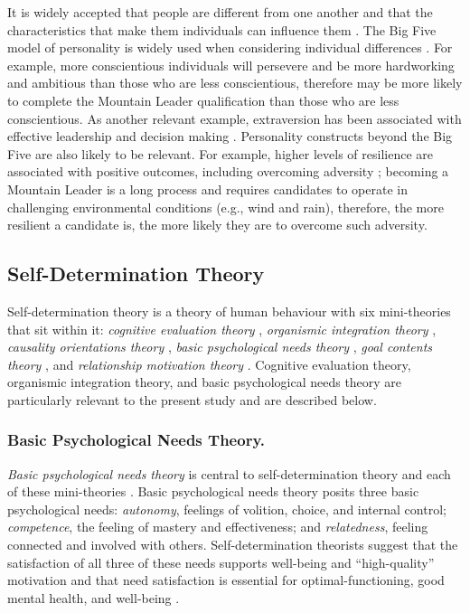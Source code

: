 \documentclass[
  12pt,
  a4paper,
]{book}
\begin{document}
It is widely accepted that people are different from one another and that the characteristics that make them individuals can influence them \citep[cf.~][]{Roberts2015}. The Big Five model of personality \citep{McCrae1987} is widely used when considering individual differences \citep{Allen2013}. For example, more conscientious individuals will persevere and be more hardworking and ambitious than those who are less conscientious, therefore may be more likely to complete the Mountain Leader qualification than those who are less conscientious. As another relevant example, extraversion has been associated with effective leadership \citep{Judge2002} and decision making \citep{Hardy1996}. Personality constructs beyond the Big Five are also likely to be relevant. For example, higher levels of resilience are associated with positive outcomes, including overcoming adversity \citep{Smith2008}; becoming a Mountain Leader is a long process and requires candidates to operate in challenging environmental conditions (e.g., wind and rain), therefore, the more resilient a candidate is, the more likely they are to overcome such adversity.

\hypertarget{gen-intro-sdt}{%
\subsection{Self-Determination Theory}\label{gen-intro-sdt}}

Self-determination theory \citep{Deci1985b, Deci2000, Ryan2017} is a theory of human behaviour with six mini-theories that sit within it: \emph{cognitive evaluation theory} \citep{Deci1975, Deci1980}, \emph{organismic integration theory} \citep{Deci1985b, Ryan1989}, \emph{causality orientations theory} \citep{Deci1985a}, \emph{basic psychological needs theory} \citep{Ryan2000a}, \emph{goal contents theory} \citep{Kasser1996, Niemiec2009}, and \emph{relationship motivation theory} \citep{Deci2014, Ryan2017}. Cognitive evaluation theory, organismic integration theory, and basic psychological needs theory are particularly relevant to the present study and are described below.

\hypertarget{basic-psychological-needs-theory.}{%
\subsubsection{Basic Psychological Needs Theory.}\label{basic-psychological-needs-theory.}}

\emph{Basic psychological needs theory} is central to self-determination theory and each of these mini-theories \citep{Ryan2002}. Basic psychological needs theory posits three basic psychological needs: \emph{autonomy}, feelings of volition, choice, and internal control; \emph{competence}, the feeling of mastery and effectiveness; and \emph{relatedness}, feeling connected and involved with others. Self-determination theorists suggest that the satisfaction of all three of these needs supports well-being and ``high-quality'' motivation \citep{Ryan2019} and that need satisfaction is essential for optimal-functioning, good mental health, and well-being \citep{Chen2015, Deci2000}.
\end{document}
